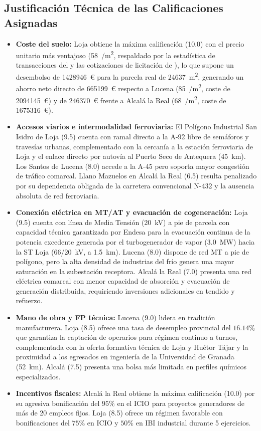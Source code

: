 \documentclass{report}
\begin{document}
\subsection{Justificación Técnica de las Calificaciones Asignadas}
\begin{itemize}
    \item \textbf{Coste del suelo:} Loja obtiene la máxima calificación (\num{10.0}) con el precio unitario más ventajoso (\SI{58}{/\metre\squared}, respaldado por la estadística de transacciones del \textcite{MIVAU2026} y las cotizaciones de licitación de \textcite{AytoLoja2025}), lo que supone un desembolso de \num{1428946}~€ para la parcela real de \SI{24637}{\square\metre}, generando un ahorro neto directo de \num{665199}~€ respecto a Lucena (\SI{85}{/\metre\squared}, coste de \num{2094145}~€) y de \num{246370}~€ frente a Alcalá la Real (\SI{68}{/\metre\squared}, coste de \num{1675316}~€).
    \item \textbf{Accesos viarios e intermodalidad ferroviaria:} El Polígono Industrial San Isidro de Loja (\num{9.5}) cuenta con ramal directo a la A-92 libre de semáforos y travesías urbanas, complementado con la cercanía a la estación ferroviaria de Loja y el enlace directo por autovía al Puerto Seco de Antequera (\SI{45}{\kilo\metre}). Los Santos de Lucena (\num{8.0}) accede a la A-45 pero soporta mayor congestión de tráfico comarcal. Llano Mazuelos en Alcalá la Real (\num{6.5}) resulta penalizado por su dependencia obligada de la carretera convencional N-432 y la ausencia absoluta de red ferroviaria.
    \item \textbf{Conexión eléctrica en MT/AT y evacuación de cogeneración:} Loja (\num{9.5}) cuenta con línea de Media Tensión (20~kV) a pie de parcela con capacidad técnica garantizada por Endesa para la evacuación continua de la potencia excedente generada por el turbogenerador de vapor (\SI{3.0}{\mega\watt}) hacia la ST Loja (66/20~kV, a \SI{1.5}{\kilo\metre}). Lucena (\num{8.0}) dispone de red MT a pie de polígono, pero la alta densidad de industrias del frío genera una mayor saturación en la subestación receptora. Alcalá la Real (\num{7.0}) presenta una red eléctrica comarcal con menor capacidad de absorción y evacuación de generación distribuida, requiriendo inversiones adicionales en tendido y refuerzo.
    \item \textbf{Mano de obra y FP técnica:} Lucena (\num{9.0}) lidera en tradición manufacturera. Loja (\num{8.5}) ofrece una tasa de desempleo provincial del $16.14\%$ que garantiza la captación de operarios para régimen continuo a turnos, complementada con la oferta formativa técnica de Loja y Huétor Tájar y la proximidad a los egresados en ingeniería de la Universidad de Granada (\SI{52}{\kilo\metre}). Alcalá (\num{7.5}) presenta una bolsa más limitada en perfiles químicos especializados.
    \item \textbf{Incentivos fiscales:} Alcalá la Real obtiene la máxima calificación (\num{10.0}) por su agresiva bonificación del $95\%$ en el ICIO para proyectos generadores de más de 20 empleos fijos. Loja (\num{8.5}) ofrece un régimen favorable con bonificaciones del $75\%$ en ICIO y $50\%$ en IBI industrial durante 5 ejercicios.
\end{itemize}
\end{document}
